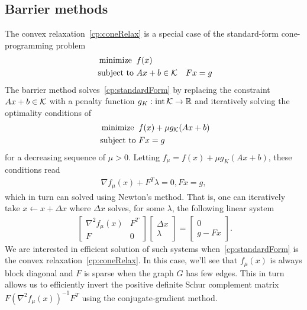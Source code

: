 \documentclass[letterpaper, 11pt]{article}
\begin{document}
\subsection{Barrier methods}
The convex relaxation~\eqref{cp:coneRelax} is a special case of the standard-form cone-programming problem
\begin{align}~\label{cp:standardForm}
  \begin{aligned}
    \operatorname*{minimize} \;\; &   f(x)\\
    \mbox{subject to } & Ax + b \in \mathcal{K}
                       & Fx = g
  \end{aligned}
\end{align}
The barrier method solves~\eqref{cp:standardForm} by
replacing the constraint $Ax + b \in \mathcal{K}$ with a penalty function  
$g_K : \operatorname*{int} \mathcal{K} \rightarrow \mathbb{R}$ and iteratively solving the optimality conditions of
\begin{align}~\label{qp:barrier}
  \begin{aligned}
    \operatorname*{minimize} \;\; &   f(x) + \mu g_{\mathcal{K}}(Ax+b) \\
    \mbox{subject to } 
                       & Fx = g
  \end{aligned}
\end{align}
for a decreasing sequence of $\mu > 0$.  
Letting $f_{\mu} = f(x) + \mu  g_K(Ax+b)$, these conditions read
\begin{align}\label{eq:barrier}
  \nabla f_{\mu}(x)+ F^T \lambda = 0, Fx = g,
\end{align}
which in turn can solved using  Newton's method. That is, one can iteratively take
$x \leftarrow x + \Delta x$ where $\Delta x$ solves, for some $\lambda$, the following linear system 
\begin{align}~\label{eq:kktsystem}
  \begin{bmatrix}
    \nabla^2 f_\mu(x)  & F^T  \\
    F  & 0 
  \end{bmatrix}
  \begin{bmatrix}
    \Delta x\\
    \lambda
  \end{bmatrix}
=
  \begin{bmatrix}
    0\\
   g - Fx
  \end{bmatrix}.
\end{align}
We are interested in efficient solution of such systems
when~\eqref{cp:standardForm} is the convex relaxation~\eqref{cp:coneRelax}.
In this case, we'll see that  $f_\mu(x)$ is
always block diagonal and $F$ is sparse when the graph $G$ has few edges. This in turn allows us to efficiently invert
the positive definite Schur complement matrix $F (\nabla^2 f_\mu(x))^{-1} F^T$
using  the conjugate-gradient method.
\end{document}
